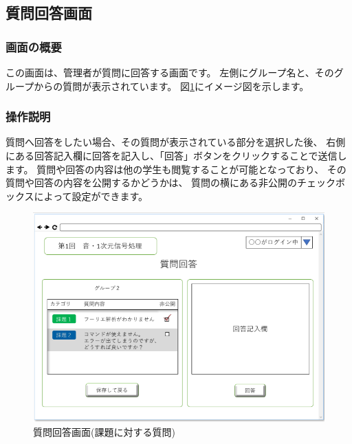 \newpage

\subsection{質問回答画面}
\subsubsection{画面の概要}
この画面は、管理者が質問に回答する画面です。
左側にグループ名と、そのグループからの質問が表示されています。
図\ref{fig:24}にイメージ図を示します。

\subsubsection{操作説明}
質問へ回答をしたい場合、その質問が表示されている部分を選択した後、
右側にある回答記入欄に回答を記入し、「回答」ボタンをクリックすることで送信します。
質問や回答の内容は他の学生も閲覧することが可能となっており、
その質問や回答の内容を公開するかどうかは、
質問の横にある非公開のチェックボックスによって設定ができます。

\begin{figure}[phtbp]
  \begin{center}
    \includegraphics[width=0.8\linewidth,clip]{./img/24.png}
    \caption{質問回答画面(課題に対する質問)}\label{fig:24}
  \end{center}
\end{figure}


